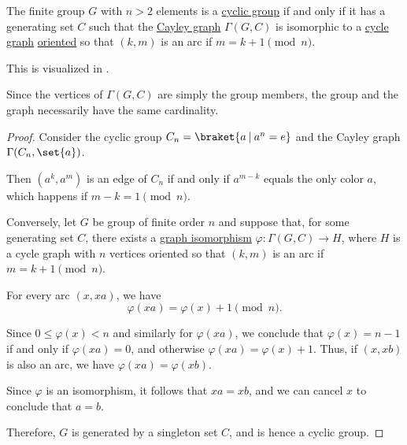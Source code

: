 \begin{proposition}\label{thm:cayley_graph_of_finite_cyclic_group}
  The finite group \( G \) with \( n > 2 \) elements is a \hyperref[def:cyclic_group]{cyclic group} if and only if it has a generating set \( C \) such that the \hyperref[def:cayley_graph]{Cayley graph} \( \Gamma(G, C) \) is isomorphic to a \hyperref[def:cycle_graph]{cycle graph} \hyperref[def:multigraph_orientation]{oriented} so that \( (k, m) \) is an arc if \( m = k + 1 \pmod n \).
\end{proposition}
\begin{comments}
  \item This is visualized in .
  \item Since the vertices of \( \Gamma(G, C) \) are simply the group members, the group and the graph necessarily have the same cardinality.
\end{comments}
\begin{proof}
  \SufficiencySubProof Consider the cyclic group \( C_n = \braket{ a \given a^n = e } \) and the Cayley graph \( \Gamma(C_n, \set{ a }) \).

  Then \( (a^k, a^m) \) is an edge of \( C_n \) if and only if \( a^{m - k} \) equals the only color \( a \), which happens if \( m - k = 1 \pmod n \).

  \NecessitySubProof Conversely, let \( G \) be group of finite order \( n \) and suppose that, for some generating set \( C \), there exists a \hyperref[def:directed_graph/homomorphism]{graph isomorphism} \( \varphi: \Gamma(G, C) \to H \), where \( H \) is a cycle graph with \( n \) vertices oriented so that \( (k, m) \) is an arc if \( m = k + 1 \pmod n \).

  For every arc \( (x, xa) \), we have
  \begin{equation*}
    \varphi(xa) = \varphi(x) + 1 \pmod n.
  \end{equation*}

  Since \( 0 \leq \varphi(x) < n \) and similarly for \( \varphi(xa) \), we conclude that \( \varphi(x) = n - 1 \) if and only if \( \varphi(xa) = 0 \), and otherwise \( \varphi(xa) = \varphi(x) + 1 \). Thus, if \( (x, xb) \) is also an arc, we have \( \varphi(xa) = \varphi(xb) \).

  Since \( \varphi \) is an isomorphism, it follows that \( xa = xb \), and we can cancel \( x \) to conclude that \( a = b \).

  Therefore, \( G \) is generated by a singleton set \( C \), and is hence a cyclic group.
\end{proof}

